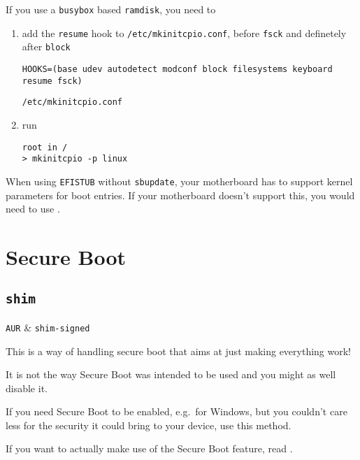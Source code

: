 \documentclass[10pt]{dustdoc}
\begin{document}
\begin{NOTE}
    If you use a \texttt{busybox} based \texttt{ramdisk}, you need to

    \begin{enumerate}
        \item add the \texttt{resume} hook to \texttt{/etc/mkinitcpio.conf}, before \texttt{fsck} and definetely after \texttt{block}

            \begin{mintedlisting}
                \begin{verbatim}
HOOKS=(base udev autodetect modconf block filesystems keyboard resume fsck)
                \end{verbatim}

                \caption{\texttt{/etc/mkinitcpio.conf}}
            \end{mintedlisting}
        \item run

            \begin{verbatim}
root in /
> mkinitcpio -p linux
            \end{verbatim}
    \end{enumerate}
\end{NOTE}

\begin{NOTE}
    When using \texttt{EFISTUB} without \texttt{sbupdate}, your motherboard has to support kernel parameters for boot entries.
    If your motherboard doesn’t support this, you would need to use .
\end{NOTE}

\section{Secure Boot}%
\label{sec:secure-boot}

\subsection{\texttt{shim}}%
\label{sec:shim}

\begin{pkgtable}
    \texttt{AUR} & \texttt{shim-signed} \\
\end{pkgtable}

\begin{WARNING}
    This is a way of handling secure boot that aims at just making everything work!

    It is not the way Secure Boot was intended to be used and you might as well disable it.

    If you need Secure Boot to be enabled, e.g.\ for Windows, but you couldn’t care less for the security it could bring to your device, use this method.

    If you want to actually make use of the Secure Boot feature, read .
\end{WARNING}
\end{document}
